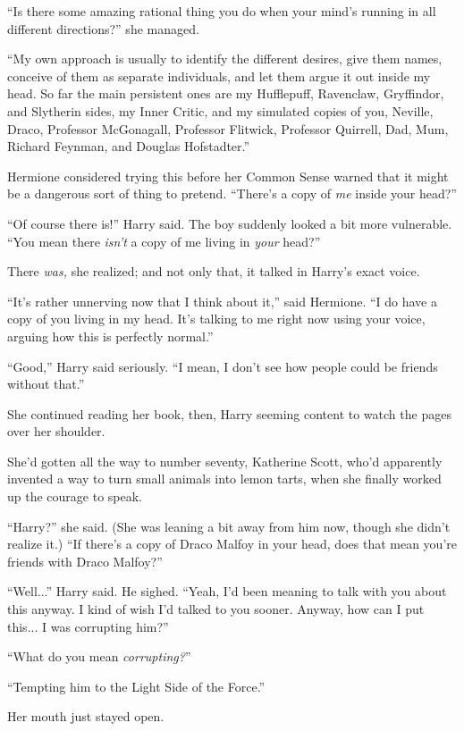``Is there some amazing rational thing you do when your mind's running in all different directions?'' she managed.

``My own approach is usually to identify the different desires, give them names, conceive of them as separate individuals, and let them argue it out inside my head. So far the main persistent ones are my Hufflepuff, Ravenclaw, Gryffindor, and Slytherin sides, my Inner Critic, and my simulated copies of you, Neville, Draco, Professor McGonagall, Professor Flitwick, Professor Quirrell, Dad, Mum, Richard Feynman, and Douglas Hofstadter.''

Hermione considered trying this before her Common Sense warned that it might be a dangerous sort of thing to pretend. ``There's a copy of \emph{me} inside your head?''

``Of course there is!'' Harry said. The boy suddenly looked a bit more vulnerable. ``You mean there \emph{isn't} a copy of me living in \emph{your} head?''

There \emph{was,} she realized; and not only that, it talked in Harry's exact voice.

``It's rather unnerving now that I think about it,'' said Hermione. ``I do have a copy of you living in my head. It's talking to me right now using your voice, arguing how this is perfectly normal.''

``Good,'' Harry said seriously. ``I mean, I don't see how people could be friends without that.''

She continued reading her book, then, Harry seeming content to watch the pages over her shoulder.

She'd gotten all the way to number seventy, Katherine Scott, who'd apparently invented a way to turn small animals into lemon tarts, when she finally worked up the courage to speak.

``Harry?'' she said. (She was leaning a bit away from him now, though she didn't realize it.) ``If there's a copy of Draco Malfoy in your head, does that mean you're friends with Draco Malfoy?''

``Well...'' Harry said. He sighed. ``Yeah, I'd been meaning to talk with you about this anyway. I kind of wish I'd talked to you sooner. Anyway, how can I put this... I was corrupting him?''

``What do you mean \emph{corrupting?}''

``Tempting him to the Light Side of the Force.''

Her mouth just stayed open.

